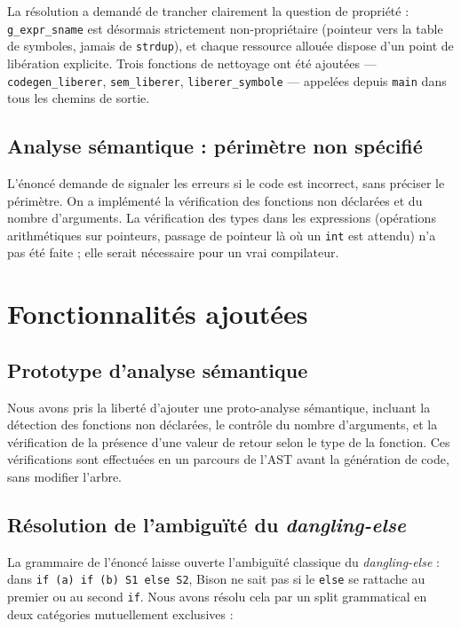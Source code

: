 \documentclass[12pt,a4paper]{article}
\begin{document}
La résolution a demandé de trancher clairement la question de propriété : \texttt{g\_expr\_sname} est désormais strictement non-propriétaire (pointeur vers la table de symboles, jamais de \texttt{strdup}), et chaque ressource allouée dispose d'un point de libération explicite. Trois fonctions de nettoyage ont été ajoutées — \texttt{codegen\_liberer}, \texttt{sem\_liberer}, \texttt{liberer\_symbole} — appelées depuis \texttt{main} dans tous les chemins de sortie.

\subsection{Analyse sémantique : périmètre non spécifié}

L'énoncé demande de signaler les erreurs si le code est incorrect, sans préciser le périmètre. On a implémenté la vérification des fonctions non déclarées et du nombre d'arguments. La vérification des types dans les expressions (opérations arithmétiques sur pointeurs, passage de pointeur là où un \texttt{int} est attendu) n'a pas été faite ; elle serait nécessaire pour un vrai compilateur.

\section{Fonctionnalités ajoutées}

\subsection{Prototype d'analyse sémantique}

Nous avons pris la liberté d'ajouter une proto-analyse sémantique, incluant la détection des fonctions non déclarées, le contrôle du nombre d'arguments, et la vérification de la présence d'une valeur de retour selon le type de la fonction. Ces vérifications sont effectuées en un parcours de l'AST avant la génération de code, sans modifier l'arbre.

\subsection{Résolution de l'ambiguïté du \textit{dangling-else}}

La grammaire de l'énoncé laisse ouverte l'ambiguïté classique du \textit{dangling-else} : dans \texttt{if (a) if (b) S1 else S2}, Bison ne sait pas si le \texttt{else} se rattache au premier ou au second \texttt{if}. Nous avons résolu cela par un split grammatical en deux catégories mutuellement exclusives :
\end{document}
